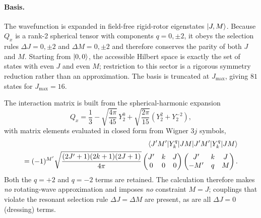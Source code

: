 \paragraph{Basis.}
The wavefunction is expanded in field-free rigid-rotor eigenstates
$\ket{J,M}$. Because $Q_x$ is a rank-2 spherical tensor with components
$q=0,\pm2$, it obeys the selection rules $\Delta J=0,\pm2$ and
$\Delta M=0,\pm2$ and therefore conserves the parity of both $J$ and $M$.
Starting from $\ket{0,0}$, the accessible Hilbert space is exactly the set of
states with even $J$ and even $M$; restriction to this sector is a rigorous
symmetry reduction rather than an approximation. The basis is truncated at
$J_{\max}$, giving $81$ states for $J_{\max}=16$.

The interaction matrix is built from the spherical-harmonic expansion
%
\begin{equation}
  Q_x = \frac{1}{3}
        - \sqrt{\frac{4\pi}{45}}\,Y_2^{0}
        + \sqrt{\frac{2\pi}{15}}\left(Y_2^{2}+Y_2^{-2}\right),
  \label{eq:app-qx-expansion}
\end{equation}
%
with matrix elements evaluated in closed form from Wigner $3j$ symbols,
%
\begin{equation}
  \begin{aligned}
  \braket{J'M'|Y_k^q|JM}
  \\= (-1)^{M'}\sqrt{\frac{(2J'+1)(2k+1)(2J+1)}{4\pi}}
    \begin{pmatrix} J' & k & J\\ 0&0&0\end{pmatrix}
    \begin{pmatrix} J' & k & J\\ -M' & q & M\end{pmatrix}.
  \end{aligned}
  \label{eq:app-wigner}
\end{equation}
%
Both the $q=+2$ and $q=-2$ terms are retained. The calculation therefore makes
\emph{no} rotating-wave approximation and imposes \emph{no} constraint
$M=J$; couplings that violate the resonant selection rule $\Delta J=\Delta M$
are present, as are all $\Delta J=0$ (dressing) terms.

